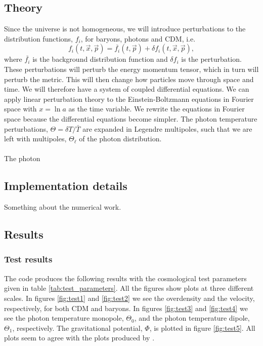 \documentclass{aa}
\begin{document}
\subsection{Theory}
Since the universe is not homogeneous, we will introduce perturbations to the distribution functions, $f_i$, for baryons, photons and CDM, i.e. \[f_i(t,\vec{x},\vec{p})
 = \overline{f_i}(t,\vec{p}) + \delta f_i(t,\vec{x},\vec{p}),\] where $\bar{f_i}$ is the background distribution function and $\delta f_i$ is the perturbation. These perturbations will perturb the 
energy momentum tensor, which in turn will perturb the metric. This will then change how particles move through space and time. We will therefore have a system of coupled differential equations.
We can apply linear perturbation theory to the Einstein-Boltzmann equations in Fourier space with $x = \ln a$ as the time variable. We rewrite the equations
in Fourier space because the differential equations become simpler. The photon temperature perturbations, $\Theta = \delta T/\bar{T}$ are expanded in Legendre multipoles,
such that we are left with multipoles, $\Theta_\ell$ of the photon distribution.\\
\\
The photon 




\subsection{Implementation details}
Something about the numerical work.

\subsection{Results}
\subsubsection{Test results}
The code produces the following results with the cosmological test parameters given in table \ref{tab:test_parameters}. All the figures show plots at three different scales.
In figures \ref{fig:test1} and \ref{fig:test2} we see the overdensity and the velocity, respectively, for both CDM and baryons. In figures \ref{fig:test3}
and \ref{fig:test4} we see the photon temperature monopole, $\Theta_0$, and the photon temperature dipole, $\Theta_1$, respectively. The gravitational potential, $\Phi$, is plotted
in figure \ref{fig:test5}. All plots seem to agree with the plots produced by \cite{winther:2023}.   
\end{document}
